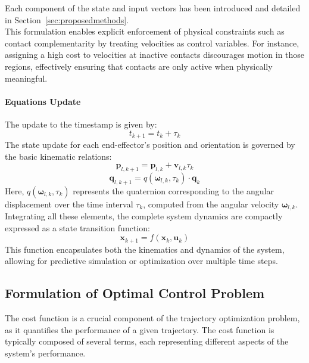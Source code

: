 \documentclass[main.tex]{subfiles}
\begin{document}
\vspace{0.3cm} 

Each component of the state and input vectors has been introduced and detailed in Section~\ref{sec:proposedmethods}.
\\ 
This formulation enables explicit enforcement of physical constraints such as contact complementarity by treating velocities as control variables. For instance, assigning a high cost to velocities at inactive contacts discourages motion in those regions, effectively ensuring that contacts are only active when physically meaningful.
\paragraph{Equations Update}
The update to the timestamp is given by:
\begin{equation}
    t_{k+1} = t_k + \tau_k
\end{equation}
The state update for each end-effector’s position and orientation is governed by the basic kinematic relations:
\begin{equation}
    \mathbf{p}_{l,k+1} = \mathbf{p}_{l,k} + \mathbf{v}_{l,k} \tau_k
\end{equation}
\begin{equation}
    \mathbf{q}_{l,k+1} = \textit{q}(\boldsymbol{\omega}_{l,k}, \tau_k) \cdot \mathbf{q}_{k}
\end{equation}
Here, $\textit{q}(\boldsymbol{\omega}_{l,k}, \tau_k)$ represents the quaternion corresponding to the angular displacement over the time interval $\tau_k$, computed from the angular velocity $\boldsymbol{\omega}_{l,k}$.
Integrating all these elements, the complete system dynamics are compactly expressed as a state transition function:
\begin{equation}
    \mathbf{x}_{k+1} = f(\mathbf{x}_k, \mathbf{u}_k)
\end{equation}
This function encapsulates both the kinematics and dynamics of the system, allowing for predictive simulation or optimization over multiple time steps.
\subsection{Formulation of Optimal Control Problem}
The cost function is a crucial component of the trajectory optimization problem, as it quantifies the performance of a given trajectory. The cost function is typically composed of several terms, each representing different aspects of the system's performance.
\end{document}
